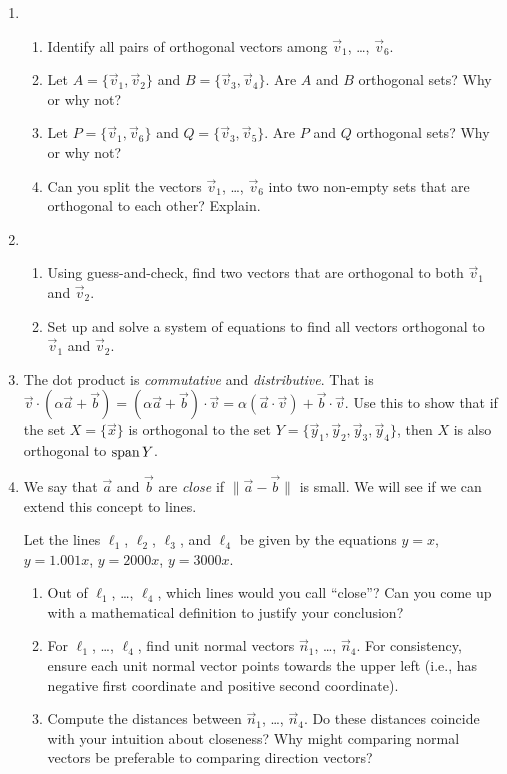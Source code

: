 \begin{enumerate}
	\item
	\begin{enumerate}
		\item Identify all pairs of orthogonal vectors among $\vec v_1$, \ldots, $\vec v_6$.
		\item Let $A=\{\vec v_1, \vec v_2\}$ and $B=\{\vec v_3,\vec v_4\}$. Are $A$ and $B$ orthogonal sets?
			Why or why not?
		\item Let $P=\{\vec v_1, \vec v_6\}$ and $Q=\{\vec v_3,\vec v_5\}$. Are $P$ and $Q$ orthogonal sets?
			Why or why not?
		\item Can you split the vectors $\vec v_1$, \ldots, $\vec v_6$ into two non-empty sets that are orthogonal to
			each other? Explain.
	\end{enumerate}
	\item
	\begin{enumerate}
		\item Using guess-and-check, find two vectors that are orthogonal to both $\vec v_1$ and $\vec v_2$.
		\item Set up and solve a system of equations to find all vectors orthogonal to $\vec v_1$ and $\vec v_2$.
	\end{enumerate}
	\item The dot product is \emph{commutative} and \emph{distributive}. That is $\vec v\cdot (\alpha\vec a+\vec b)=
		(\alpha\vec a+\vec b)\cdot \vec v=\alpha(\vec a\cdot \vec v)+\vec b\cdot\vec v$. Use this to show that if
		the set $X=\{\vec x\}$ is orthogonal to the set $Y=\{\vec y_1,\vec y_2,\vec y_3,\vec y_4\}$,
		then $X$ is also orthogonal to $\operatorname{span} Y$.
	
	\item We say that $\vec a$ and $\vec b$ are \emph{close} if $\|\vec a-\vec b\|$ is small. We will see if we can
		extend this concept to lines.

		Let the lines $\ell_1$, $\ell_2$, $\ell_3$, and $\ell_4$ be given by the equations $y=x$, $y=1.001x$,
				$y=2000x$, $y=3000x$.
		\begin{enumerate}
			\item Out of $\ell_1$, \ldots, $\ell_4$, which lines would you call ``close''? Can you come up
				with a mathematical definition to justify your conclusion?
			\item For $\ell_1$, \ldots, $\ell_4$, find unit normal vectors $\vec n_1$, \ldots, $\vec n_4$.
				For consistency, ensure each unit normal vector points towards the upper left (i.e., has negative first coordinate
				and positive second coordinate).
			\item Compute the distances between $\vec n_1$, \ldots, $\vec n_4$. Do these distances coincide with your
				intuition about closeness? Why might comparing normal vectors be preferable to comparing direction vectors?
		\end{enumerate}
	
\end{enumerate} 